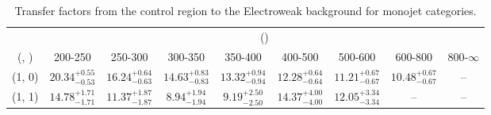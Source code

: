 \begin{table}[h!]
\tiny
\centering
\caption{Transfer factors from the \mmj control region to the Electroweak background for monojet categories.\label{tab:tf_mumu_total_mono}}
\begin{tabular}
{ccccccccc}
	\hline\hline
	& \multicolumn{8}{c}{\scalht (\gev)} \\ 
	 (\njet,  \nb) & 200-250 & 250-300 & 300-350 & 350-400 & 400-500 & 500-600 & 600-800 & 800-$\infty$ \\ [0.8ex] 
\hline
	(1, 0) & $20.34^{+ 0.55 }_{- 0.53 }$ & $16.24^{+ 0.64 }_{- 0.63 }$ & $14.63^{+ 0.83 }_{- 0.83 }$ & $13.32^{+ 0.94 }_{- 0.94 }$ & $12.28^{+ 0.64 }_{- 0.64 }$ & $11.21^{+ 0.67 }_{- 0.67 }$ & $10.48^{+ 0.67 }_{- 0.67 }$ & -- \\[0.5ex] 
	(1, 1) & $14.78^{+ 1.71 }_{- 1.71 }$ & $11.37^{+ 1.87 }_{- 1.87 }$ & $8.94^{+ 1.94 }_{- 1.94 }$ & $9.19^{+ 2.50 }_{- 2.50 }$ & $14.37^{+ 4.00 }_{- 4.00 }$ & $12.05^{+ 3.34 }_{- 3.34 }$ & -- & -- \\[0.5ex] 
	\hline
	\hline
\end{tabular}
\end{table}
